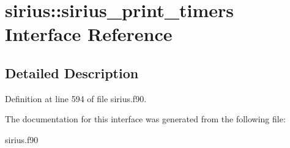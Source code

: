 \hypertarget{interfacesirius_1_1sirius__print__timers}{}\section{sirius\+:\+:sirius\+\_\+print\+\_\+timers Interface Reference}
\label{interfacesirius_1_1sirius__print__timers}


\subsection{Detailed Description}


Definition at line 594 of file sirius.\+f90.



The documentation for this interface was generated from the following file\+:\begin{DoxyCompactItemize}
\item 
sirius.\+f90\end{DoxyCompactItemize}
